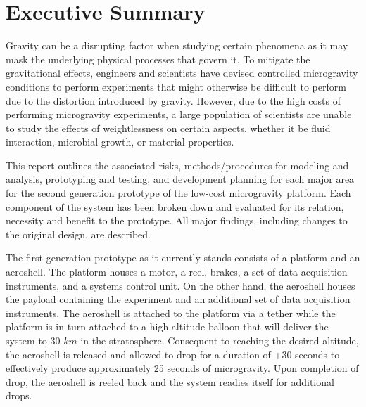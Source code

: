 \begin{titlepage}
{%

\vfill %
}

\end{titlepage}



\section*{Executive Summary}

\indent\indent Gravity can be a disrupting factor when studying certain phenomena as it may mask the underlying physical processes that govern it. To mitigate the gravitational effects, engineers and scientists have devised controlled microgravity conditions to perform experiments that might otherwise be difficult to perform due to the distortion introduced by gravity. However, due to the high costs of performing microgravity experiments, a large population of scientists are unable to study the effects of weightlessness on certain aspects, whether it be fluid interaction, microbial growth, or material properties.

This report outlines the associated risks, methods/procedures for modeling and analysis, prototyping and testing, and development planning for each major area for the second generation prototype of the low-cost microgravity platform. Each component of the system has been broken down and evaluated for its relation, necessity and benefit to the prototype. All major findings, including changes to the original design, are described.

The first generation prototype as it currently stands consists of a platform and an aeroshell. The platform houses a motor, a reel, brakes, a set of data acquisition instruments, and a systems control unit. On the other hand, the aeroshell houses the payload containing the experiment and an additional set of data acquisition instruments. The aeroshell is attached to the platform via a tether while the platform is in turn attached to a high-altitude balloon that will deliver the system to 30 $km$ in the stratosphere. Consequent to reaching the desired altitude, the aeroshell is released and allowed to drop for a duration of +30 seconds to effectively produce approximately 25 seconds of microgravity. Upon completion of drop, the aeroshell is reeled back and the system readies itself for additional drops.

